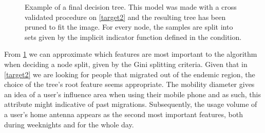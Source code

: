 
\clearpage

\begin{figure}
    \centering
    \caption{ Example of a final decision tree.
        This model was made with a cross validated procedure on \cref{target2} and the resulting tree has been pruned to fit the image.
        For every node, the samples are split into sets given by the implicit indicator function defined in the condition.}
    \label{fig:decision_tree_actual_problem}
\end{figure}






From \cref{fig:decision_tree_actual_problem} we can approximate which features are most important to the algorithm when deciding a node split, given by the Gini splitting criteria.
Given that in \cref{target2} we are looking for people that migrated out of the endemic region, the choice of the tree's root feature seems appropriate.
The mobility diameter gives an idea of a user's influence area when using their mobile phone and as such, this attribute might indicative of past migrations.
Subsequently, the usage volume of a user's home antenna appears as the second most important features, both during weeknights and for the whole day.

